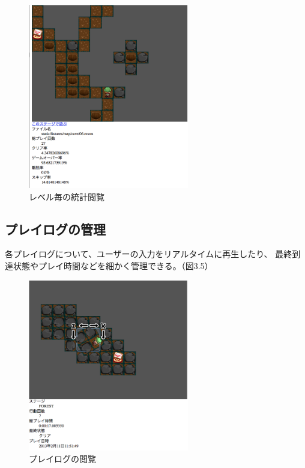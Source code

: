 \begin{figure}[htbp]
  \begin{center}
    \includegraphics[bb=0 0 654 754, width=7cm]{images/level.png}
  \end{center}
  \caption{レベル毎の統計閲覧}
  \label{fig:one}
\end{figure}


\subsection{プレイログの管理}
各プレイログについて、ユーザーの入力をリアルタイムに再生したり、
最終到達状態やプレイ時間などを細かく管理できる。（図3.5）

\begin{figure}[htbp]
  \begin{center}
    \includegraphics[bb=0 0 644 689, width=7cm]{images/metric.png}
  \end{center}
  \caption{プレイログの閲覧}
  \label{fig:one}
\end{figure}


